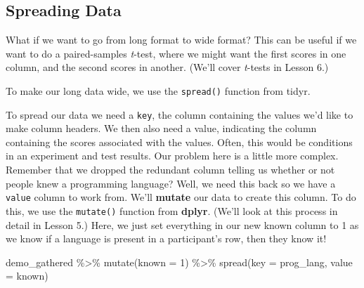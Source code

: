 \documentclass[
]{book}
\newenvironment{Shaded}{\begin{snugshade}}{\end{snugshade}}
\newcommand{\AttributeTok}[1]{\textcolor[rgb]{0.77,0.63,0.00}{#1}}
\newcommand{\DecValTok}[1]{\textcolor[rgb]{0.00,0.00,0.81}{#1}}
\newcommand{\FunctionTok}[1]{\textcolor[rgb]{0.00,0.00,0.00}{#1}}
\newcommand{\NormalTok}[1]{#1}
\newcommand{\SpecialCharTok}[1]{\textcolor[rgb]{0.00,0.00,0.00}{#1}}
\begin{document}
\hypertarget{spreading-data}{%
\subsection{Spreading Data}\label{spreading-data}}

What if we want to go from long format to wide format? This can be useful if we want to do a paired-samples \emph{t}-test, where we might want the first scores in one column, and the second scores in another. (We'll cover \emph{t}-tests in Lesson 6.)

To make our long data wide, we use the \texttt{spread()} function from tidyr.

To spread our data we need a \texttt{key}, the column containing the values we'd like to make column headers. We then also need a value, indicating the column containing the scores associated with the values. Often, this would be conditions in an experiment and test results.
Our problem here is a little more complex. Remember that we dropped the redundant column telling us whether or not people knew a programming language? Well, we need this back so we have a \texttt{value} column to work from. We'll \textbf{mutate} our data to create this column. To do this, we use the \texttt{mutate()} function from \textbf{dplyr}. (We'll look at this process in detail in Lesson 5.) Here, we just set everything in our new known column to 1 as we know if a language is present in a participant's row, then they know it!

\begin{Shaded}
\begin{Highlighting}[]
\NormalTok{demo\_gathered }\SpecialCharTok{\%\textgreater{}\%} 
  \FunctionTok{mutate}\NormalTok{(}\AttributeTok{known =} \DecValTok{1}\NormalTok{) }\SpecialCharTok{\%\textgreater{}\%}
  \FunctionTok{spread}\NormalTok{(}\AttributeTok{key =}\NormalTok{ prog\_lang, }\AttributeTok{value =}\NormalTok{ known)}
\end{Highlighting}
\end{Shaded}
\end{document}
